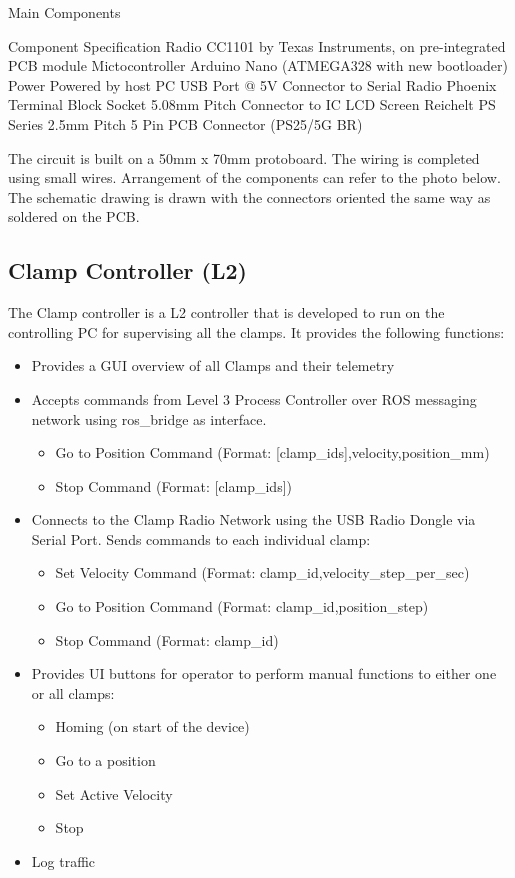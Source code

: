 \begin{itemize}
Main Components

Component
Specification
Radio
CC1101 by Texas Instruments, on pre-integrated PCB module
Mictocontroller
Arduino Nano (ATMEGA328 with new bootloader)
Power
Powered by host PC USB Port @ 5V
Connector to Serial Radio
Phoenix Terminal Block Socket 5.08mm Pitch
Connector to IC LCD Screen
Reichelt PS Series 2.5mm Pitch 5 Pin PCB Connector (PS25/5G BR)  


The circuit is built on a 50mm x 70mm protoboard. The wiring is completed using small wires. Arrangement of the components can refer to the photo below. The schematic drawing is drawn with the connectors oriented the same way as soldered on the PCB.

\subsection{Clamp Controller (L2)}
The Clamp controller is a L2 controller that is developed to run on the controlling PC for supervising all the clamps. It provides the following functions:
\begin{itemize}
\item Provides a GUI overview of all Clamps and their telemetry
\item Accepts commands from Level 3 Process Controller over ROS messaging network using ros_bridge as interface.
\begin{itemize}
    \item Go to Position Command (Format: [clamp_ids],velocity,position_mm)
    \item Stop Command (Format: [clamp_ids])
\end{itemize}
\item Connects to the Clamp Radio Network using the USB Radio Dongle via Serial Port. Sends commands to each individual clamp:
\begin{itemize}
    \item Set Velocity Command (Format: clamp_id,velocity_step_per_sec)
    \item Go to Position Command (Format: clamp_id,position_step)
    \item Stop Command (Format: clamp_id)
\end{itemize}
\item Provides UI buttons for operator to perform manual functions to either one or all clamps:
    \begin{itemize}
    \item Homing (on start of the device)
    \item Go to a position
    \item Set Active Velocity
    \item Stop
\end{itemize}
\item Log traffic
\end{itemize}


\end{itemize}
